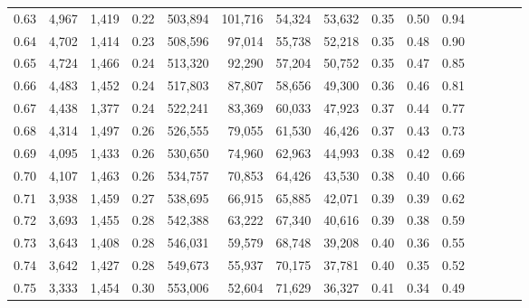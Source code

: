 \begin{tabular}{rrrcrrrrrrrrrrr}
0.63 &   4,967 &  1,419 &                                       0.22 &  503,894 &  101,716 &   54,324 &   53,632 &  0.35 &  0.50 &                         0.94 \\
0.64 &   4,702 &  1,414 &                                       0.23 &  508,596 &   97,014 &   55,738 &   52,218 &  0.35 &  0.48 &                         0.90 \\
0.65 &   4,724 &  1,466 &                                       0.24 &  513,320 &   92,290 &   57,204 &   50,752 &  0.35 &  0.47 &                         0.85 \\
0.66 &   4,483 &  1,452 &                                       0.24 &  517,803 &   87,807 &   58,656 &   49,300 &  0.36 &  0.46 &                         0.81 \\
0.67 &   4,438 &  1,377 &                                       0.24 &  522,241 &   83,369 &   60,033 &   47,923 &  0.37 &  0.44 &                         0.77 \\
0.68 &   4,314 &  1,497 &                                       0.26 &  526,555 &   79,055 &   61,530 &   46,426 &  0.37 &  0.43 &                         0.73 \\
0.69 &   4,095 &  1,433 &                                       0.26 &  530,650 &   74,960 &   62,963 &   44,993 &  0.38 &  0.42 &                         0.69 \\
0.70 &   4,107 &  1,463 &                                       0.26 &  534,757 &   70,853 &   64,426 &   43,530 &  0.38 &  0.40 &                         0.66 \\
0.71 &   3,938 &  1,459 &                                       0.27 &  538,695 &   66,915 &   65,885 &   42,071 &  0.39 &  0.39 &                         0.62 \\
0.72 &   3,693 &  1,455 &                                       0.28 &  542,388 &   63,222 &   67,340 &   40,616 &  0.39 &  0.38 &                         0.59 \\
0.73 &   3,643 &  1,408 &                                       0.28 &  546,031 &   59,579 &   68,748 &   39,208 &  0.40 &  0.36 &                         0.55 \\
0.74 &   3,642 &  1,427 &                                       0.28 &  549,673 &   55,937 &   70,175 &   37,781 &  0.40 &  0.35 &                         0.52 \\
0.75 &   3,333 &  1,454 &                                       0.30 &  553,006 &   52,604 &   71,629 &   36,327 &  0.41 &  0.34 &                         0.49 \\

\end{tabular}

